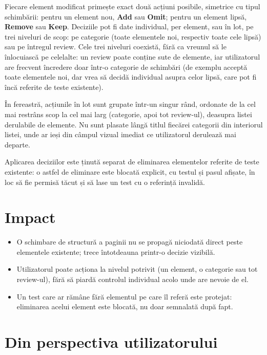 \documentclass[12pt,a4paper]{report}
\newcommand{\UI}[1]{\textbf{#1}}
\begin{document}
Fiecare element modificat primește exact două acțiuni posibile, simetrice cu tipul schimbării: pentru un element nou, \UI{Add} sau \UI{Omit}; pentru un element lipsă, \UI{Remove} sau \UI{Keep}. Deciziile pot fi date individual, per element, sau în lot, pe trei niveluri de scop: pe categorie (toate elementele noi, respectiv toate cele lipsă) sau pe întregul review. Cele trei niveluri coexistă, fără ca vreunul să le înlocuiască pe celelalte: un review poate conține sute de elemente, iar utilizatorul are frecvent încredere doar într-o categorie de schimbări (de exemplu acceptă toate elementele noi, dar vrea să decidă individual asupra celor lipsă, care pot fi încă referite de teste existente).

În fereastră, acțiunile în lot sunt grupate într-un singur rând, ordonate de la cel mai restrâns scop la cel mai larg (categorie, apoi tot review-ul), deasupra listei derulabile de elemente. Nu sunt plasate lângă titlul fiecărei categorii din interiorul listei, unde ar ieși din câmpul vizual imediat ce utilizatorul derulează mai departe.

Aplicarea deciziilor este ținută separat de eliminarea elementelor referite de teste existente: o astfel de eliminare este blocată explicit, cu testul și pasul afișate, în loc să fie permisă tăcut și să lase un test cu o referință invalidă.

\section{Impact}

\begin{itemize}
  \item O schimbare de structură a paginii nu se propagă niciodată direct peste elementele existente; trece întotdeauna printr-o decizie vizibilă.
  \item Utilizatorul poate acționa la nivelul potrivit (un element, o categorie sau tot review-ul), fără să piardă controlul individual acolo unde are nevoie de el.
  \item Un test care ar rămâne fără elementul pe care îl referă este protejat: eliminarea acelui element este blocată, nu doar semnalată după fapt.
\end{itemize}

\section{Din perspectiva utilizatorului}
\end{document}
